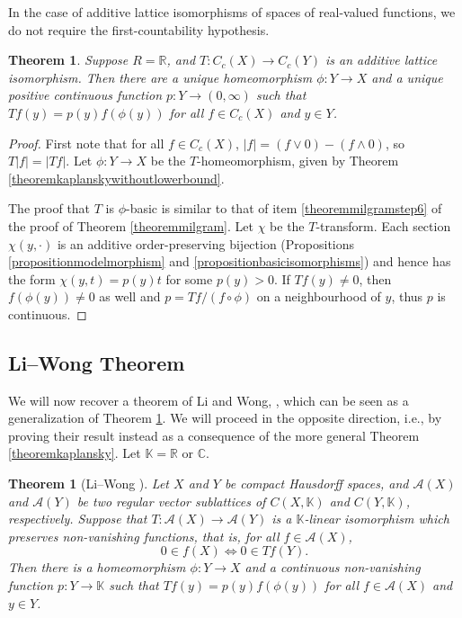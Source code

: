 \documentclass[letter,11pt]{amsart}
\theoremstyle{plain}		\newtheorem{theorem}[generalnumbering]{Theorem}
\theoremstyle{plain}		\newtheorem{corollary}[generalnumbering]{Corollary}
\theoremstyle{definition}		\newtheorem{definition}[generalnumbering]{Definition}
\theoremstyle{definition}		\newtheorem{example}[generalnumbering]{Example}
\theoremstyle{plain}		\newtheorem{proposition}[generalnumbering]{Proposition}
\theoremstyle{plain}		\newtheorem{lemma}[generalnumbering]{Lemma}
\theoremstyle{plain}    \newtheorem{plainstyle}[generalnumbering]{\namefordifferentenvironment}
\theoremstyle{plain}    \newtheorem*{plainstyle*}{\namefordifferentenvironment}
\theoremstyle{definition}    \newtheorem{definitionstyle}[generalnumbering]{\namefordifferentenvironment}
\theoremstyle{definition}    \newtheorem*{definitionstyle*}{\namefordifferentenvironment}
\begin{document}
In the case of additive lattice isomorphisms of spaces of real-valued functions, we do not require the first-countability hypothesis.

\begin{theorem}\label{theoremadditivekaplansky}
	Suppose $R=\mathbb{R}$, and $T\colon C_c(X)\to C_c(Y)$ is an additive lattice isomorphism. Then there are a unique homeomorphism $\phi\colon Y\to X$ and a unique positive continuous function $p\colon Y\to (0,\infty)$ such that $Tf(y)=p(y)f(\phi(y))$ for all $f\in C_c(X)$ and $y\in Y$.
\end{theorem}
\begin{proof}
	
	First note that for all $f\in C_c(X)$, $|f|=(f\lor 0)-(f\land 0)$, so $T|f|=|Tf|$. Let $\phi\colon Y\to X$ be the $T$-homeomorphism, given by Theorem \ref{theoremkaplanskywithoutlowerbound}.
	
	The proof that $T$ is $\phi$-basic is similar to that of item \ref{theoremmilgramstep6} of the proof of Theorem \ref{theoremmilgram}. Let $\chi$ be the $T$-transform. Each section $\chi(y,\cdot)$ is an additive order-preserving bijection (Propositions \ref{propositionmodelmorphism} and \ref{propositionbasicisomorphisms}) and hence has the form $\chi(y,t)=p(y)t$ for some $p(y)>0$. If $Tf(y)\neq 0$, then $f(\phi(y))\neq 0$ as well and $p=Tf/(f\circ \phi)$ on a neighbourhood of $y$, thus $p$ is continuous.\qedhere
\end{proof}


\subsection{Li--Wong Theorem}\label{subsectionliwong}

We will now recover a theorem of Li and Wong, \cite[Theorem 2.2]{MR3162258}, which can be seen as a generalization of Theorem \ref{theoremadditivekaplansky}. We will proceed in the opposite direction, i.e., by proving their result instead as a consequence of the more general Theorem \ref{theoremkaplansky}. Let $\mathbb{K}=\mathbb{R}$ or $\mathbb{C}$.

\begin{theorem}[Li--Wong \cite{MR3162258}]\label{theoremliwong}
	Let $X$ and $Y$ be compact Hausdorff spaces, and $\mathcal{A}(X)$ and $\mathcal{A}(Y)$ be two regular vector sublattices of $C(X,\mathbb{K})$ and $C(Y,\mathbb{K})$, respectively. Suppose that $T\colon \mathcal{A}(X)\to \mathcal{A}(Y)$ is a $\mathbb{K}$-linear isomorphism which preserves non-vanishing functions, that is, for all $f\in\mathcal{A}(X)$,
	\[0\in f(X)\iff 0\in Tf(Y).\]
	Then there is a homeomorphism $\phi\colon Y\to X$ and a continuous non-vanishing function $p\colon Y\to\mathbb{K}$ such that $Tf(y)=p(y)f(\phi(y))$ for all $f\in\mathcal{A}(X)$ and $y\in Y$.
\end{theorem}
\end{document}
